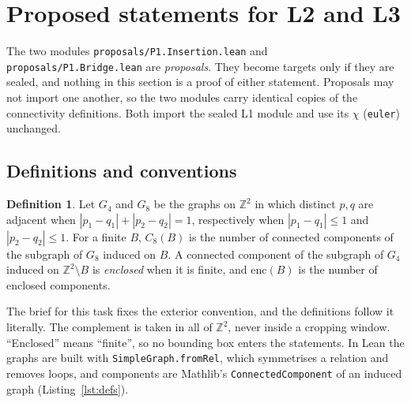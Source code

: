 \documentclass[11pt]{article}
\theoremstyle{definition}
\newtheorem{definition}[theorem]{Definition}
\theoremstyle{remark}
\begin{document}
\section{Proposed statements for L2 and L3}\label{sec:proposals}

The two modules \texttt{proposals/P1.Insertion.lean} and
\texttt{proposals/P1.Bridge.lean} are \emph{proposals}. They become targets only
if they are sealed, and nothing in this section is a proof of either statement.
Proposals may not import one another, so the two modules carry identical copies
of the connectivity definitions. Both import the sealed L1 module and use its
$\chi$ (\texttt{euler}) unchanged.

\subsection{Definitions and conventions}

\begin{definition}
Let $G_4$ and $G_8$ be the graphs on $\mathbb{Z}^2$ in which distinct $p,q$ are
adjacent when $|p_1-q_1|+|p_2-q_2|=1$, respectively when $|p_1-q_1|\le1$ and
$|p_2-q_2|\le1$. For a finite $B$, $C_8(B)$ is the number of connected
components of the subgraph of $G_8$ induced on $B$. A connected component of the
subgraph of $G_4$ induced on $\mathbb{Z}^2\setminus B$ is \emph{enclosed} when it
is finite, and $\mathrm{enc}(B)$ is the number of enclosed components.
\end{definition}

The brief for this task fixes the exterior convention, and the definitions follow
it literally. The complement is taken in all of $\mathbb{Z}^2$, never inside a
cropping window. ``Enclosed'' means ``finite'', so no bounding box enters the
statements. In Lean the graphs are built with \texttt{SimpleGraph.fromRel},
which symmetrises a relation and removes loops, and components are Mathlib's
\texttt{ConnectedComponent} of an induced graph
(Listing~\ref{lst:defs}).
\end{document}

